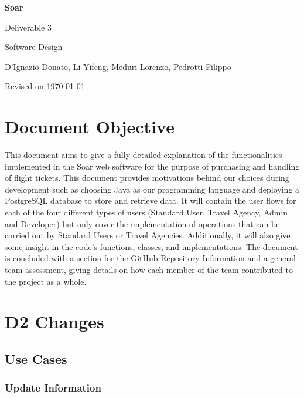 \documentclass[12pt,a4paper]{article}
\begin{document}
	
	\begin{titlepage}
		\centering
		\vspace*{2.4cm}
		{\Huge\bfseries\color{titleblue} Soar\par}
		\vspace{0.4cm}
		{\Large Deliverable 3\par}
		\vspace{0.4cm}
		{\large Software Design \par}
		\vspace{1.6cm}
		{\large D'Ignazio Donato, Li Yifeng, Meduri Lorenzo, Pedrotti Filippo\par}
		\vfill
		{\large Revised on \today\par}
	\end{titlepage}
	
	\tableofcontents
	\newpage
	\section{Document Objective}
		This document aims to give a fully detailed explanation of the functionalities implemented in the Soar web software for the purpose of purchasing and handling of flight tickets. This document provides motivations behind our choices during development such as choosing Java as our programming language and deploying a PostgreSQL database to store and retrieve data. It will contain the user flows for each of the four different types of users (Standard User, Travel Agency, Admin and Developer) but only cover the implementation of operations that can be carried out by Standard Users or Travel Agencies. Additionally, it will also give some insight in the code's functions, classes, and implementations. The document is concluded with a section for the GitHub Repository Information and a general team assessment, giving details on how each member of the team contributed to the project as a whole.

    \section{D2 Changes}

        \subsection{Use Cases}

            \subsubsection{Update Information}
\end{document}
